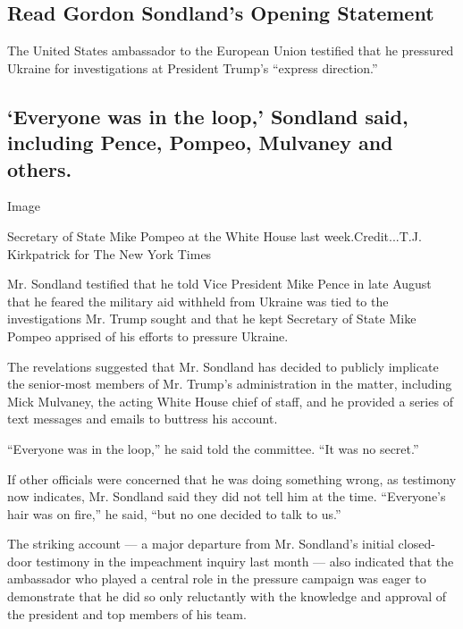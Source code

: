 \hypertarget{read-gordon-sondlands-opening-statement}{%
\subsection{Read Gordon Sondland's Opening
Statement}\label{read-gordon-sondlands-opening-statement}}

The United States ambassador to the European Union testified that he
pressured Ukraine for investigations at President Trump's ``express
direction.''

\hypertarget{everyone-was-in-the-loop-sondland-said-including-pence-pompeo-mulvaney-and-others}{%
\subsection{`Everyone was in the loop,' Sondland said, including Pence,
Pompeo, Mulvaney and
others.}\label{everyone-was-in-the-loop-sondland-said-including-pence-pompeo-mulvaney-and-others}}

Image

Secretary of State Mike Pompeo at the White House last
week.Credit...T.J. Kirkpatrick for The New York Times

Mr. Sondland testified that he told Vice President Mike Pence in late
August that he feared the military aid withheld from Ukraine was tied to
the investigations Mr. Trump sought and that he kept Secretary of State
Mike Pompeo apprised of his efforts to pressure Ukraine.

The revelations suggested that Mr. Sondland has decided to publicly
implicate the senior-most members of Mr. Trump's administration in the
matter, including Mick Mulvaney, the acting White House chief of staff,
and he provided a series of text messages and emails to buttress his
account.

``Everyone was in the loop,'' he said told the committee. ``It was no
secret.''

If other officials were concerned that he was doing something wrong, as
testimony now indicates, Mr. Sondland said they did not tell him at the
time. ``Everyone's hair was on fire,'' he said, ``but no one decided to
talk to us.''

The striking account --- a major departure from Mr. Sondland's initial
closed-door testimony in the impeachment inquiry last month --- also
indicated that the ambassador who played a central role in the pressure
campaign was eager to demonstrate that he did so only reluctantly with
the knowledge and approval of the president and top members of his team.

